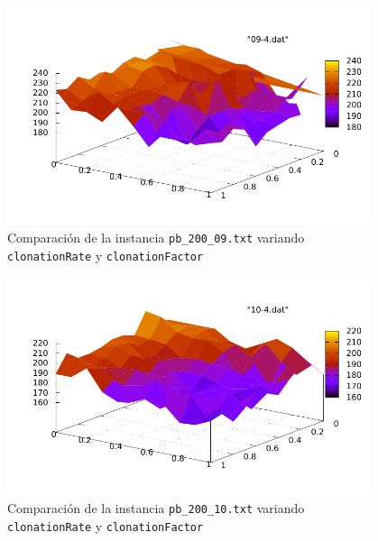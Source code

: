 \begin{figure}[h!]
\begin{center}
	\includegraphics[width=0.95\textwidth]{img/09-4.pdf}
	\caption{Comparaci\'on de la instancia \texttt{pb\_200\_09.txt} variando \texttt{clonationRate} y \texttt{clonationFactor}}
	\label{fig:4-2}
\end{center}
\end{figure}

\newpage 
\begin{figure}[h!]
\begin{center}
	\includegraphics[width=0.95\textwidth]{img/10-4.pdf}
	\caption{Comparaci\'on de la instancia \texttt{pb\_200\_10.txt} variando \texttt{clonationRate} y \texttt{clonationFactor}}
	\label{fig:4-3}
\end{center}
\end{figure}


\newpage
%
%
